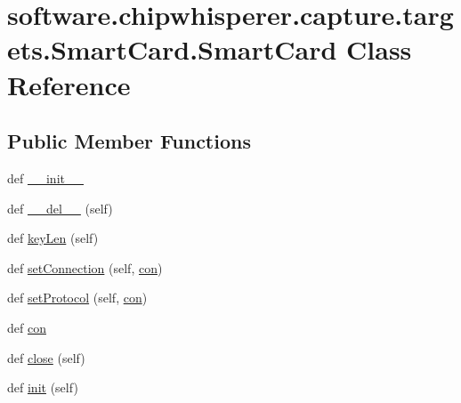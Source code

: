 \hypertarget{classsoftware_1_1chipwhisperer_1_1capture_1_1targets_1_1SmartCard_1_1SmartCard}{}\section{software.\+chipwhisperer.\+capture.\+targets.\+Smart\+Card.\+Smart\+Card Class Reference}
\label{classsoftware_1_1chipwhisperer_1_1capture_1_1targets_1_1SmartCard_1_1SmartCard}
\subsection*{Public Member Functions}
\begin{DoxyCompactItemize}
\item 
def \hyperlink{classsoftware_1_1chipwhisperer_1_1capture_1_1targets_1_1SmartCard_1_1SmartCard_a1078f73e3fffdca9adb3069fb364a9e9}{\+\_\+\+\_\+init\+\_\+\+\_\+}
\item 
def \hyperlink{classsoftware_1_1chipwhisperer_1_1capture_1_1targets_1_1SmartCard_1_1SmartCard_aa202441bf0ac4c434c012451e907f115}{\+\_\+\+\_\+del\+\_\+\+\_\+} (self)
\item 
def \hyperlink{classsoftware_1_1chipwhisperer_1_1capture_1_1targets_1_1SmartCard_1_1SmartCard_a615a618263c0fffe0b190bb1c1366ef7}{key\+Len} (self)
\item 
def \hyperlink{classsoftware_1_1chipwhisperer_1_1capture_1_1targets_1_1SmartCard_1_1SmartCard_ac372aceb1e80d66bae60912808e24961}{set\+Connection} (self, \hyperlink{classsoftware_1_1chipwhisperer_1_1capture_1_1targets_1_1SmartCard_1_1SmartCard_a34c10a2e8b8214d9fa2074dae39c6145}{con})
\item 
def \hyperlink{classsoftware_1_1chipwhisperer_1_1capture_1_1targets_1_1SmartCard_1_1SmartCard_acb11d2535b8c1744199fccbfeac3430e}{set\+Protocol} (self, \hyperlink{classsoftware_1_1chipwhisperer_1_1capture_1_1targets_1_1SmartCard_1_1SmartCard_a34c10a2e8b8214d9fa2074dae39c6145}{con})
\item 
def \hyperlink{classsoftware_1_1chipwhisperer_1_1capture_1_1targets_1_1SmartCard_1_1SmartCard_a34c10a2e8b8214d9fa2074dae39c6145}{con}
\item 
def \hyperlink{classsoftware_1_1chipwhisperer_1_1capture_1_1targets_1_1SmartCard_1_1SmartCard_a8df98929dac376c0d790dda1521e3f7c}{close} (self)
\item 
def \hyperlink{classsoftware_1_1chipwhisperer_1_1capture_1_1targets_1_1SmartCard_1_1SmartCard_af97daed4c917587c329bf73f2c97ee33}{init} (self)

\end{DoxyCompactItemize}
